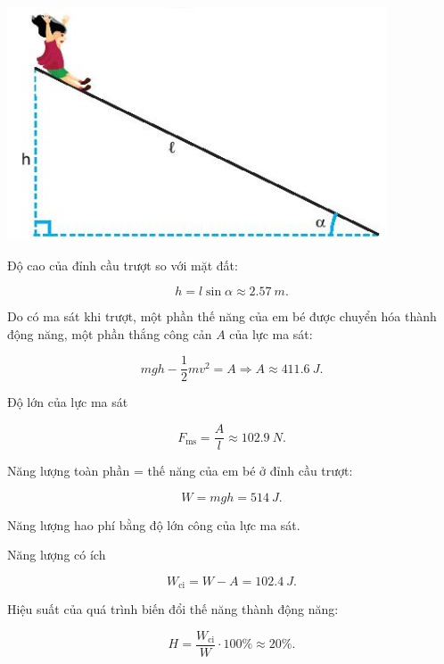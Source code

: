 \begin{enumerate}[label=\bfseries Câu \arabic*:]
	\hideall
	{	
		
		\begin{center}
			\includegraphics[scale=0.8]{../figs/VN10-2022-PH-TP030-1.jpg}
		\end{center}
	
		Độ cao của đỉnh cầu trượt so với mặt đất:
		
		$$ h = l\sin \alpha \approx \SI{2,57}{m}.$$
		
		Do có ma sát khi trượt, một phần thế năng của em bé được chuyển hóa thành động năng, một phần thắng công cản $A$ của lực ma sát:
		
		$$mgh - \dfrac{1}{2}mv^2 = A \Rightarrow A \approx \SI{411,6}{J}.$$
		
		Độ lớn của lực ma sát
		
		$$F_\text{ms} = \dfrac{A}{l} \approx \SI{102,9}{N}.$$
		
		Năng lượng toàn phần = thế năng của em bé ở đỉnh cầu trượt:
		
		$$W = mgh = \SI{514}{J}.$$
		
		Năng lượng hao phí bằng độ lớn công của lực ma sát. 
		
		Năng lượng có ích
		
		$$W_\text{ci} = W - A = \SI{102,4}{J}.$$
		
		Hiệu suất của quá trình biến đổi thế năng thành động năng:
		
		$$H = \dfrac{W_\text{ci}}{W} \cdot 100\% \approx 20\%.$$
	}
	
\end{enumerate}
